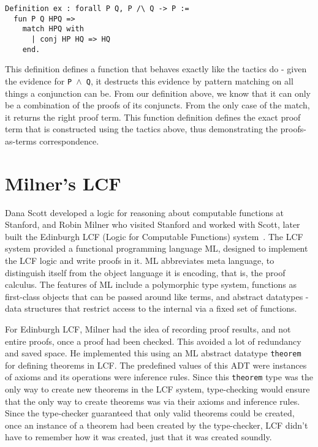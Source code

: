 \documentclass{article}
\begin{document}
\begin{verbatim}
Definition ex : forall P Q, P /\ Q -> P :=
  fun P Q HPQ => 
    match HPQ with
	  | conj HP HQ => HQ
    end.
\end{verbatim}
	This definition defines a function that 
	behaves exactly like the tactics do - 
	given the evidence for \texttt{P $\land$ Q},
	it destructs this evidence by pattern
	matching on all things a conjunction can 
	be. From our definition above, we know 
	that it can only be a combination of 
	the proofs of its conjuncts. From the 
	only case of the match, it returns the 
	right proof term. This function 
	definition defines the exact proof term 
	that is constructed using the tactics 
	above, thus demonstrating the 
	proofs-as-terms correspondence.

\section{Milner's LCF}
\label{sec:lcf}
	Dana Scott developed a logic for 
	reasoning about computable functions at 
	Stanford, and Robin Milner who visited 
	Stanford and worked with Scott, 
	later built the Edinburgh LCF
	(Logic for Computable Functions) 
	system~\cite{Gordon1978EdinburghLA}.
	The LCF system provided a functional 
	programming language ML, designed to 
	implement the LCF logic and write proofs 
	in it. ML abbreviates meta language, 
	to distinguish itself from the object 
	language it is encoding, that is, the 
	proof calculus. The features of ML 
	include a polymorphic type system, 
	functions as first-class objects 
	that can be passed around like terms, 
	and abstract datatypes - data 
	structures that restrict access to the 
	internal via a fixed set of functions. 
	
	For Edinburgh LCF,
	Milner had the idea of recording proof
	results, and not entire proofs, once a 
	proof had been checked. This avoided a 
	lot of redundancy and saved space.
	He implemented this using 
	an ML abstract datatype \texttt{theorem} 
	for defining theorems in LCF. The 
	predefined values of this ADT were 
	instances of axioms and its operations 
	were inference rules. Since this 
	\texttt{theorem} type was the only
	way to create new theorems in the LCF 
	system, type-checking would ensure that 
	the only way to create theorems 
	was via their axioms and inference 
	rules. Since the type-checker guaranteed
	that only valid theorems could be 
	created, once an instance of a theorem 
	had been created by the type-checker, 
	LCF didn't have to remember how it 
	was created, just that it was created 
	soundly. 
	
\end{document}
